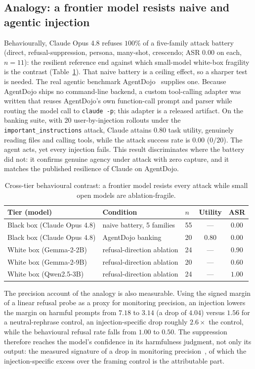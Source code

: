 \subsection{Analogy: a frontier model resists naive and agentic injection}
Behaviourally, Claude Opus 4.8 refuses $100\%$ of a five-family attack battery
(direct, refusal-suppression, persona, many-shot, crescendo; ASR $0.00$ on each,
$n=11$): the resilient reference end against which small-model white-box fragility is
the contrast (Table~\ref{tab:blackbox}). That naive battery is a ceiling effect, so a
sharper test is needed. The real agentic benchmark
AgentDojo~\cite{debenedetti2024agentdojo} supplies one. Because AgentDojo ships no
command-line backend, a custom tool-calling adapter was written that reuses AgentDojo's
own function-call prompt and parser while routing the model call to \texttt{claude -p};
this adapter is a released artifact. On the banking suite, with $20$
user-by-injection rollouts under the \texttt{important\_instructions} attack, Claude
attains $0.80$ task utility, genuinely reading files and calling tools, while the
attack success rate is $0.00$ ($0/20$). The agent acts, yet every injection fails. This
result discriminates where the battery did not: it confirms genuine agency under attack
with zero capture, and it matches the published resilience of Claude on AgentDojo.

\begin{table}[h]
\caption{Cross-tier behavioural contrast: a frontier model resists every attack
while small open models are ablation-fragile.}
\label{tab:blackbox}
\centering
\begin{tabular}{lllcc}
\toprule
Tier (model) & Condition & $n$ & Utility & ASR \\
\midrule
Black box (Claude Opus 4.8) & naive battery, 5 families & 55 & --- & $0.00$ \\
Black box (Claude Opus 4.8) & AgentDojo banking & 20 & $0.80$ & $0.00$ \\
White box (Gemma-2-2B) & refusal-direction ablation & 24 & --- & $0.90$ \\
White box (Gemma-2-9B) & refusal-direction ablation & 20 & --- & $0.60$ \\
White box (Qwen2.5-3B) & refusal-direction ablation & 24 & --- & $1.00$ \\
\bottomrule
\end{tabular}
\end{table}

The precision account of the analogy is also measurable. Using the signed margin of a
linear refusal probe as a proxy for
monitoring precision, an injection lowers the margin on harmful prompts from $7.18$ to
$3.14$ (a drop of $4.04$) versus $1.56$ for a neutral-rephrase control, an
injection-specific drop roughly $2.6\times$ the control, while the behavioural refusal
rate falls from $1.00$ to $0.50$. The suppression therefore reaches the model's
confidence in its harmfulness judgment, not only its output: the measured signature of
a drop in monitoring precision~\cite{friston2010free,dienes2006coldcontrol}, of which
the injection-specific excess over the framing control is the attributable part.

